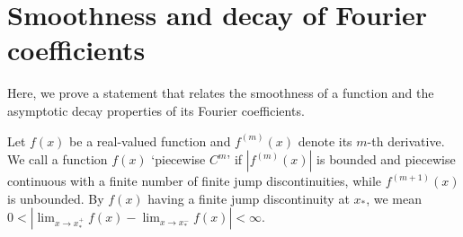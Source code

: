\documentclass[12pt, nofootinbib]{article}
\theoremstyle{plain}
\theoremstyle{assumption}
\theoremstyle{definition}
\theoremstyle{plain}
\theoremstyle{plain}
\theoremstyle{plain}
\theoremstyle{plain}
\theoremstyle{plain}
\begin{document}
\section{Smoothness and decay of Fourier coefficients}
\label{sec:smooth-fourier}
Here, we prove a statement that relates the smoothness of a function and the asymptotic decay properties of its Fourier coefficients.

Let $f(x)$ be a real-valued function and $f^{(m)}(x)$ denote its $m$-th derivative. We call a function $f(x)$ `piecewise $C^m$' if $|f^{(m)}(x)|$ 
is bounded and piecewise continuous with a finite number of finite jump discontinuities, while $f^{(m+1)}(x)$ is unbounded. By $f(x)$ having a finite jump discontinuity at $x_{*}$, we mean $0<|\lim_{x\to x_{*}^{+}}f(x)-\lim_{x\to x_{*}^{-}}f(x)|<\infty$.
\end{document}
